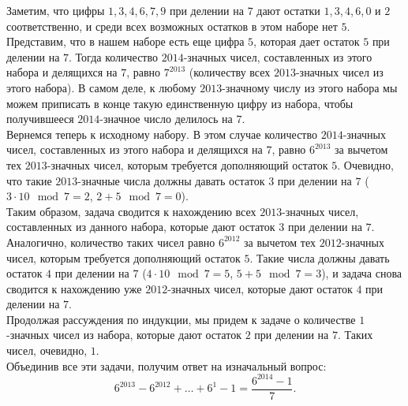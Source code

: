 \documentclass{article}
\begin{document}
Заметим, что цифры $1$,$\,3$,$\,4$,$\,6$,$\,7$,$\,9$ при делении на $7$ дают остатки $1$,$\,3$,$\,4$,$\,6$,$\,0$ и $2$ соответственно, и среди всех возможных остатков в 
этом наборе нет $5$. Представим, что в нашем наборе есть еще цифра $5$, которая дает остаток $5$ при делении на $7$. Тогда количество $2014$-значных чисел, составленных из этого 
набора и делящихся на $7$, равно $7^{2013}$ (количеству всех $2013$-значных чисел из этого набора). В самом деле, к любому $2013$-значному числу из этого набора мы можем приписать в конце 
такую единственную цифру из набора, чтобы получившееся $2014$-значное число делилось на $7$.\\
Вернемся теперь к исходному набору. В этом случае количество $2014$-значных чисел, составленных из этого набора и делящихся на $7$, равно $6^{2013}$ за вычетом тех $2013$-значных чисел, 
которым требуется дополняющий остаток $5$. Очевидно, что такие $2013$-значные числа должны давать остаток $3$ при делении на $7$ ($3\cdot 10 \mod 7 = 2$, $2+5 \mod 7 = 0$).\\
Таким образом, задача сводится к нахождению всех $2013$-значных чисел, составленных из данного набора, которые дают остаток $3$ при делении на $7$. Аналогично, количество таких чисел 
равно $6^{2012}$ за вычетом тех $2012$-значных чисел, которым требуется дополняющий остаток $5$. Такие числа должны давать остаток $4$ при делении на $7$ ($4\cdot 10 \mod 7 =5$, $5+5 \mod 7 = 3$), и 
задача снова сводится к нахождению уже $2012$-значных чисел, которые дают остаток $4$ при делении на $7$.\\
Продолжая рассуждения по индукции, мы придем к задаче о количестве $1$-значных чисел из набора, которые дают остаток $2$ при делении на $7$. Таких чисел, очевидно, $1$.\\
Объединив все эти задачи, получим ответ на изначальный вопрос:
$$6^{2013} - 6^{2012} + \ldots + 6^1 - 1 = \frac{6^{2014}-1}{7}.$$
\end{document}

